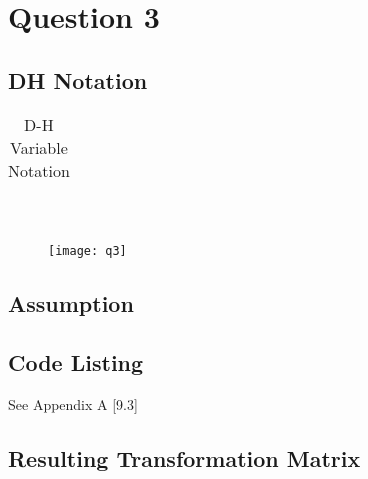 \newpage
\section{Question 3}
	\subsection*{DH Notation}
	\noindent
		\begin{table}[position = here]
		\begin{centering}
		\begin{tabular}{||l|l|l|l|l||}

		\end{tabular}\\
		\end{centering}
		\begin{flushleft}
		\caption [DHVariables] {D-H Variable Notation}
		\end{flushleft}
		\end{table}
		
		
		\begin{figure}[position = here]
			\begin{centering}
				\texttt{[image: q3]}\\
			\end{centering}
		\end{figure}
		
	\pagebreak
	\subsection*{Assumption}

	\subsection*{Code Listing}
	See Appendix A [9.3]
	
	\subsection*{Resulting Transformation Matrix}
